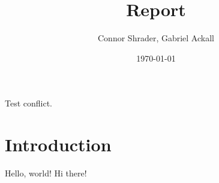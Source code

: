 \documentclass{article}
\title{Report}
\author{Connor Shrader, Gabriel Ackall}
\date{\today}
\begin{document}
Test conflict.

\maketitle

\section{Introduction}
Hello, world! Hi there!
\end{document}
